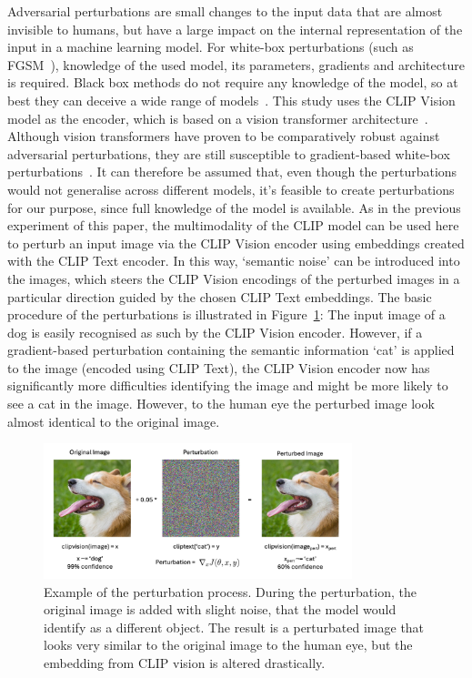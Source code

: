 Adversarial perturbations are small changes to the input data that are almost invisible to humans, but have a large impact on the internal representation of the input in a machine learning model. For white-box perturbations (such as FGSM~\cite{goodfellowExplainingHarnessingAdversarial2014}), knowledge of the used model, its parameters, gradients and architecture is required. Black box methods do not require any knowledge of the model, so at best they can deceive a wide range of models~\cite{papernotPracticalBlackBoxAttacks2017}. This study uses the CLIP Vision model as the encoder, which is based on a vision transformer architecture~\cite{dosovitskiyImageWorth16x162021}. Although vision transformers have proven to be comparatively robust against adversarial perturbations, they are still susceptible to gradient-based white-box perturbations~\cite{naseerIntriguingPropertiesVision2021}. It can therefore be assumed that, even though the perturbations would not generalise across different models, it's feasible to create perturbations for our purpose, since full knowledge of the model is available. As in the previous experiment of this paper, the multimodality of the CLIP model can be used here to perturb an input image via the CLIP Vision encoder using embeddings created with the CLIP Text encoder. In this way, `semantic noise' can be introduced into the images, which steers the CLIP Vision encodings of the perturbed images in a particular direction guided by the chosen CLIP Text embeddings. The basic procedure of the perturbations is illustrated in Figure~\ref{fig:perturbation_example}: The input image of a dog is easily recognised as such by the CLIP Vision encoder. However, if a gradient-based perturbation containing the semantic information `cat' is applied to the image  (encoded using CLIP Text), the CLIP Vision encoder now has significantly more difficulties identifying the image and might be more likely to see a cat in the image. However, to the human eye the perturbed image look almost identical to the original image.

\begin{figure}[ht]
    \centering
    \includegraphics[width=0.8\textwidth]{plots/peturbation_example.png}
    \caption[Example of the perturbation process]{Example of the perturbation process. During the perturbation, the original image is added with slight noise, that the model would identify as a different object. The result is a perturbated image that looks very similar to the original image to the human eye, but the embedding from CLIP vision is altered drastically.}\label{fig:perturbation_example}
\end{figure}

